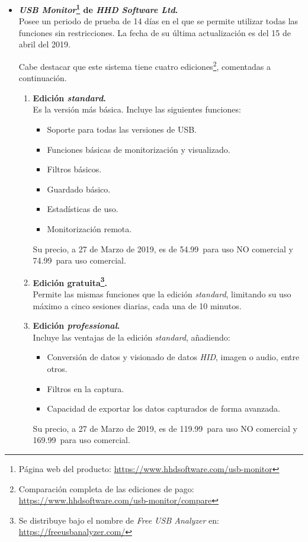 \begin{itemize}
    \item \textbf{\emph{USB Monitor}\footnote{Página web del producto: \url{https://www.hhdsoftware.com/usb-monitor}} de \emph{HHD Software Ltd}.} \\
    Posee un periodo de prueba de 14 días en el que se permite utilizar todas las funciones sin restricciones. La fecha de su última actualización es del 15 de abril del 2019.

    Cabe destacar que este sistema tiene cuatro ediciones\footnote{Comparación completa de las ediciones de pago: \url{https://www.hhdsoftware.com/usb-monitor/compare}}, comentadas a continuación.
    \begin{enumerate}
        \item \textbf{Edición \emph{standard}.} \\ 
        Es la versión más básica. Incluye las siguientes funciones:
        \begin{itemize}
            \item Soporte para todas las versiones de USB.
            \item Funciones básicas de monitorización y visualizado.
            \item Filtros básicos.
            \item Guardado básico.
            \item Estadísticas de uso.
            \item Monitorización remota.
        \end{itemize}
        Su precio, a 27 de Marzo de 2019, es de 54.99\texteuro ~para uso NO comercial y 74.99\texteuro ~para uso comercial.

        \item \textbf{Edición gratuita\footnote{Se distribuye bajo el nombre de \emph{Free USB Analyzer} en: \url{https://freeusbanalyzer.com/}}.} \\
        Permite las mismas funciones que la edición \emph{standard}, limitando su uso máximo a cinco sesiones diarias, cada una de 10 minutos.
        
        \item \textbf{Edición \emph{professional}.} \\
        Incluye las ventajas de la edición \emph{standard}, añadiendo:
        \begin{itemize}
            \item Conversión de datos y visionado de datos \emph{HID}, imagen o audio, entre otros.
            \item Filtros en la captura.
            \item Capacidad de exportar los datos capturados de forma avanzada.
        \end{itemize}
        Su precio, a 27 de Marzo de 2019, es de 119.99\texteuro ~para uso NO comercial y 169.99\texteuro ~para uso comercial.
        

\end{enumerate}
\end{itemize}
